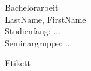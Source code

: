\begin{minipage}{\textwidth}
	\begin{flushright}
	Bachelorarbeit\\
	LastName, FirstName\\
	Studienfang: ... \\
	Seminargruppe: ...
	\end{flushright}
\end{minipage}



Etikett